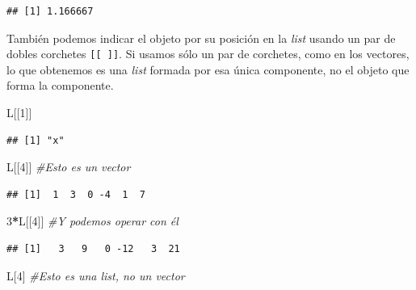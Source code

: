 \documentclass[]{book}
\newenvironment{Shaded}{\begin{snugshade}}{\end{snugshade}}
\newcommand{\CommentTok}[1]{\textcolor[rgb]{0.56,0.35,0.01}{\textit{#1}}}
\newcommand{\DecValTok}[1]{\textcolor[rgb]{0.00,0.00,0.81}{#1}}
\newcommand{\NormalTok}[1]{#1}
\newcommand{\OperatorTok}[1]{\textcolor[rgb]{0.81,0.36,0.00}{\textbf{#1}}}
\theoremstyle{definition}
\theoremstyle{definition}
\theoremstyle{definition}
\theoremstyle{remark}
\begin{document}
\begin{Shaded}
\end{Shaded}

\begin{verbatim}
## [1] 1.166667
\end{verbatim}

También podemos indicar el objeto por su posición en la \emph{list} usando un par de dobles corchetes \texttt{{[}{[}\ {]}{]}}. Si usamos sólo un par de corchetes, como en los vectores, lo que obtenemos es una \emph{list} formada por esa única componente, no el objeto que forma la componente.

\begin{Shaded}
\begin{Highlighting}[]
\NormalTok{L[[}\DecValTok{1}\NormalTok{]]}
\end{Highlighting}
\end{Shaded}

\begin{verbatim}
## [1] "x"
\end{verbatim}

\begin{Shaded}
\begin{Highlighting}[]
\NormalTok{L[[}\DecValTok{4}\NormalTok{]]  }\CommentTok{#Esto es un vector}
\end{Highlighting}
\end{Shaded}

\begin{verbatim}
## [1]  1  3  0 -4  1  7
\end{verbatim}

\begin{Shaded}
\begin{Highlighting}[]
\DecValTok{3}\OperatorTok{*}\NormalTok{L[[}\DecValTok{4}\NormalTok{]] }\CommentTok{#Y podemos operar con él}
\end{Highlighting}
\end{Shaded}

\begin{verbatim}
## [1]   3   9   0 -12   3  21
\end{verbatim}

\begin{Shaded}
\begin{Highlighting}[]
\NormalTok{L[}\DecValTok{4}\NormalTok{]   }\CommentTok{#Esto es una list, no un vector}
\end{Highlighting}
\end{Shaded}
\end{document}
